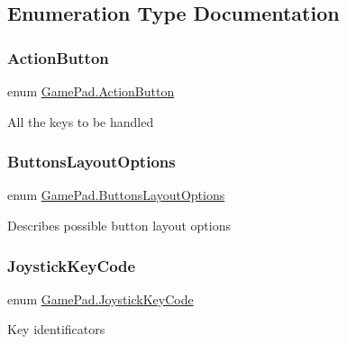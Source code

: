 \subsection{Enumeration Type Documentation}
\mbox{\label{namespace_game_pad_a44223473808aa2a8e5df26ad04b2f0ec}} 
\subsubsection{\texorpdfstring{ActionButton}{ActionButton}}
{\footnotesize\ttfamily enum \mbox{\hyperlink{namespace_game_pad_a44223473808aa2a8e5df26ad04b2f0ec}{Game\+Pad.\+Action\+Button}}\hspace{0.3cm}{\ttfamily [strong]}}



All the keys to be handled 

\mbox{\label{namespace_game_pad_ad65f651e47321df25402246e8df26c37}} 
\subsubsection{\texorpdfstring{ButtonsLayoutOptions}{ButtonsLayoutOptions}}
{\footnotesize\ttfamily enum \mbox{\hyperlink{namespace_game_pad_ad65f651e47321df25402246e8df26c37}{Game\+Pad.\+Buttons\+Layout\+Options}}\hspace{0.3cm}{\ttfamily [strong]}}



Describes possible button layout options 

\mbox{\label{namespace_game_pad_ac76b16e8c3ac78facd993c355ab2c337}} 
\subsubsection{\texorpdfstring{JoystickKeyCode}{JoystickKeyCode}}
{\footnotesize\ttfamily enum \mbox{\hyperlink{namespace_game_pad_ac76b16e8c3ac78facd993c355ab2c337}{Game\+Pad.\+Joystick\+Key\+Code}}\hspace{0.3cm}{\ttfamily [strong]}}



Key identificators 


